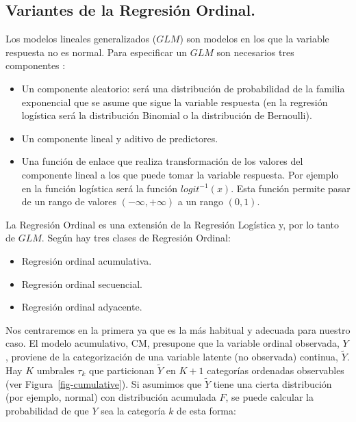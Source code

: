 \documentclass[
  12pt,
  a4paper,
  extrafontsizes,
  onecolumn,
  openright]{memoir}
\providecommand{\tightlist}{%
  \setlength{\itemsep}{0pt}\setlength{\parskip}{0pt}}\usepackage{longtable,booktabs,array}
\begin{document}
\hypertarget{variantes-de-la-regresiuxf3n-ordinal.}{%
\subsection{Variantes de la Regresión
Ordinal.}\label{variantes-de-la-regresiuxf3n-ordinal.}}

Los modelos lineales generalizados (\(GLM\)) son modelos en los que la
variable respuesta no es normal. Para especificar un \(GLM\) son
necesarios tres componentes \autocite[ver][]{oconnell2006}:

\begin{itemize}
\tightlist
\item
  Un componente aleatorio: será una distribución de probabilidad de la
  familia exponencial que se asume que sigue la variable respuesta (en
  la regresión logística será la distribución Binomial o la distribución
  de Bernoulli).
\item
  Un componente lineal y aditivo de predictores.
\item
  Una función de enlace que realiza transformación de los valores del
  componente lineal a los que puede tomar la variable respuesta. Por
  ejemplo en la función logística será la función \(logit^{-1}(x)\).
  Esta función permite pasar de un rango de valores
  \((-\infty, +\infty)\) a un rango \((0, 1)\).
\end{itemize}

La Regresión Ordinal es una extensión de la Regresión Logística y, por
lo tanto de \(GLM\). Según \textcite{burkner2019} hay tres clases de
Regresión Ordinal:

\begin{itemize}
\tightlist
\item
  Regresión ordinal acumulativa.
\item
  Regresión ordinal secuencial.
\item
  Regresión ordinal adyacente.
\end{itemize}

Nos centraremos en la primera ya que es la más habitual y adecuada para
nuestro caso. El modelo acumulativo, CM, presupone que la variable
ordinal observada, \(Y\), proviene de la categorización de una variable
latente (no observada) continua, \(\tilde{Y}\). Hay \(K\) umbrales
\(\tau_k\) que particionan \(\tilde{Y}\) en \(K + 1\) categorías
ordenadas observables (ver Figura~\ref{fig-cumulative}). Si asumimos que
\(\tilde{Y}\) tiene una cierta distribución (por ejemplo, normal) con
distribución acumulada \(F\), se puede calcular la probabilidad de que
\(Y\) sea la categoría \(k\) de esta forma:
\end{document}
